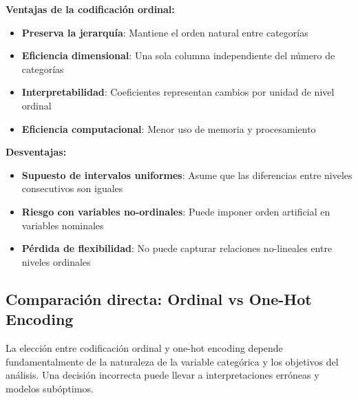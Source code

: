 \documentclass[
  letterpaper,
  DIV=11,
  numbers=noendperiod]{scrreprt}
\providecommand{\tightlist}{%
  \setlength{\itemsep}{0pt}\setlength{\parskip}{0pt}}
\begin{document}
\begin{tcolorbox}[enhanced jigsaw, leftrule=.75mm, breakable, colbacktitle=quarto-callout-note-color!10!white, bottomrule=.15mm, colframe=quarto-callout-note-color-frame, toprule=.15mm, colback=white, coltitle=black, bottomtitle=1mm, left=2mm, title=\textcolor{quarto-callout-note-color}{\faInfo}\hspace{0.5em}{Ventajas y desventajas}, opacityback=0, arc=.35mm, opacitybacktitle=0.6, toptitle=1mm, titlerule=0mm, rightrule=.15mm]

\textbf{Ventajas de la codificación ordinal:}

\begin{itemize}
\tightlist
\item
  \textbf{Preserva la jerarquía}: Mantiene el orden natural entre
  categorías
\item
  \textbf{Eficiencia dimensional}: Una sola columna independiente del
  número de categorías
\item
  \textbf{Interpretabilidad}: Coeficientes representan cambios por
  unidad de nivel ordinal
\item
  \textbf{Eficiencia computacional}: Menor uso de memoria y
  procesamiento
\end{itemize}

\textbf{Desventajas:}

\begin{itemize}
\tightlist
\item
  \textbf{Supuesto de intervalos uniformes}: Asume que las diferencias
  entre niveles consecutivos son iguales
\item
  \textbf{Riesgo con variables no-ordinales}: Puede imponer orden
  artificial en variables nominales
\item
  \textbf{Pérdida de flexibilidad}: No puede capturar relaciones
  no-lineales entre niveles ordinales
\end{itemize}

\end{tcolorbox}

\subsection{Comparación directa: Ordinal vs One-Hot
Encoding}\label{comparaciuxf3n-directa-ordinal-vs-one-hot-encoding}

La elección entre codificación ordinal y one-hot encoding depende
fundamentalmente de la naturaleza de la variable categórica y los
objetivos del análisis. Una decisión incorrecta puede llevar a
interpretaciones erróneas y modelos subóptimos.
\end{document}
